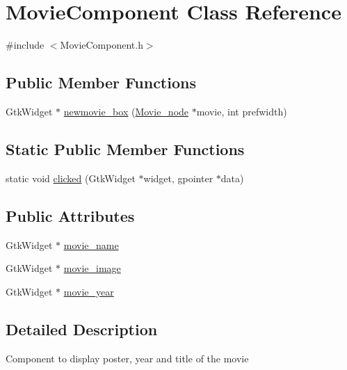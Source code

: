 \hypertarget{classMovieComponent}{}\section{Movie\+Component Class Reference}
\label{classMovieComponent}


{\ttfamily \#include $<$Movie\+Component.\+h$>$}

\subsection*{Public Member Functions}
\begin{DoxyCompactItemize}
\item 
Gtk\+Widget $\ast$ \hyperlink{classMovieComponent_ae7f41fdb7d5e25fe4fd9875d43bce685}{newmovie\+\_\+box} (\hyperlink{classMovie__node}{Movie\+\_\+node} $\ast$movie, int prefwidth)
\end{DoxyCompactItemize}
\subsection*{Static Public Member Functions}
\begin{DoxyCompactItemize}
\item 
static void \hyperlink{classMovieComponent_aca8fc8b09e090478bb590ecebb88a6c3}{clicked} (Gtk\+Widget $\ast$widget, gpointer $\ast$data)
\end{DoxyCompactItemize}
\subsection*{Public Attributes}
\begin{DoxyCompactItemize}
\item 
Gtk\+Widget $\ast$ \hyperlink{classMovieComponent_a304b93d11fe9f4e6e6effc4244592a7a}{movie\+\_\+name}
\item 
Gtk\+Widget $\ast$ \hyperlink{classMovieComponent_ac8de14a84c32db1e8bbdc5b004d8730b}{movie\+\_\+image}
\item 
Gtk\+Widget $\ast$ \hyperlink{classMovieComponent_a670093104aa5c8c5826ae1c7e0d05007}{movie\+\_\+year}
\end{DoxyCompactItemize}


\subsection{Detailed Description}
Component to display poster, year and title of the movie 

